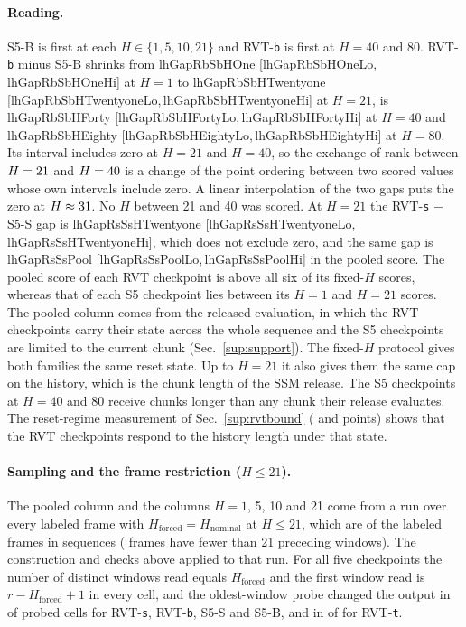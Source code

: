 \documentclass[10pt,twocolumn,letterpaper]{article}
\newcommand{\lhgap}[3]{\csname lhGap#1#2#3\endcsname{} [\csname lhGap#1#2#3Lo\endcsname,\,\csname lhGap#1#2#3Hi\endcsname]}
\begin{document}
\paragraph{Reading.}
S5-B is first at each $H\in\{1,5,10,21\}$ and RVT-\texttt{b} is first at $H=40$ and 80. RVT-\texttt{b} minus S5-B shrinks from \lhgap{Rb}{Sb}{HOne} at $H=1$ to \lhgap{Rb}{Sb}{HTwentyone} at $H=21$, is \lhgap{Rb}{Sb}{HForty} at $H=40$ and \lhgap{Rb}{Sb}{HEighty} at $H=80$. Its interval includes zero at $H=21$ and $H=40$, so the exchange of rank between $H=21$ and $H=40$ is a change of the point ordering between two scored values whose own intervals include zero. A linear interpolation of the two gaps puts the zero at $H\approx31$. No $H$ between 21 and 40 was scored. At $H=21$ the RVT-\texttt{s} $-$ S5-S gap is \lhgap{Rs}{Ss}{HTwentyone}, which does not exclude zero, and the same gap is \lhgap{Rs}{Ss}{Pool} in the pooled score. The pooled score of each RVT checkpoint is above all six of its fixed-$H$ scores, whereas that of each S5 checkpoint lies between its $H=1$ and $H=21$ scores. The pooled column comes from the released evaluation, in which the RVT checkpoints carry their state across the whole sequence and the S5 checkpoints are limited to the current chunk (Sec.~\ref{sup:support}). The fixed-$H$ protocol gives both families the same reset state. Up to $H=21$ it also gives them the same cap on the history, which is the chunk length of the SSM release. The S5 checkpoints at $H=40$ and 80 receive chunks longer than any chunk their release evaluates. The reset-regime measurement of Sec.~\ref{sup:rvtbound} (\rvtBoundResetS{} and \rvtBoundResetB{} points) shows that the RVT checkpoints respond to the history length under that state.

\paragraph{Sampling and the frame restriction ($H\le21$).}
The pooled column and the columns $H=1$, 5, 10 and 21 come from a run over every labeled frame with $H_{\mathrm{forced}}=H_{\mathrm{nominal}}$ at $H\le21$, which are \fhNCommon{} of the \fhNAll{} labeled frames in \fhNSeq{} sequences (\fhNExcl{} frames have fewer than 21 preceding windows). The construction and checks above applied to that run. For all five checkpoints the number of distinct windows read equals $H_{\mathrm{forced}}$ and the first window read is $r-H_{\mathrm{forced}}+1$ in every cell, and the oldest-window probe changed the output in \fhProbeHit{} of \fhProbeN{} probed cells for RVT-\texttt{s}, RVT-\texttt{b}, S5-S and S5-B, and in \fhProbeHitT{} of \fhProbeN{} for RVT-\texttt{t}.
\end{document}
